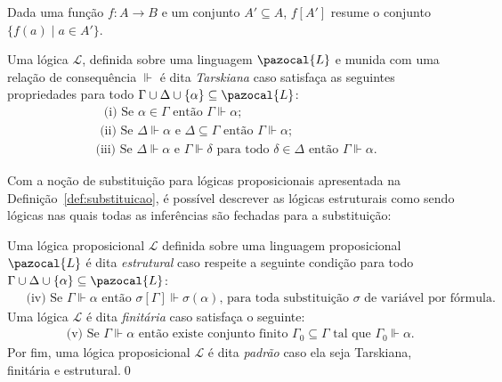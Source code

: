\begin{definicao}
    \begin{notacao}
        Dada uma função $f : A \to B$ e um conjunto $A' \subseteq A$, $f[A']$ resume o conjunto $\{f(a) \; | \; a \in A'\}$.
    \end{notacao}


    \begin{definicao}
        \label{def:tarski}
        Uma lógica $\mathcal{L}$, definida sobre uma linguagem $\pazocal{L}$ e munida com uma relação de consequência $\Vdash$ é dita \textit{Tarskiana} caso satisfaça as seguintes propriedades para todo $\Gamma \cup \Delta \cup \{\alpha\} \subseteq \pazocal{L}$:
        \begin{align}
            & \text{~~(i) Se } \alpha \in \Gamma \text{ então } \Gamma \Vdash \alpha;\tag{reflexividade}                                                                                       \\
            & \text{~(ii) Se } \Delta \Vdash \alpha \text{ e } \Delta \subseteq \Gamma \text{ então } \Gamma \Vdash \alpha;\tag{monotonicidade}                                                \\
            & \text{(iii) Se } \Delta \Vdash \alpha \text{ e } \Gamma \Vdash \delta \text{ para todo } \delta \in \Delta \text{ então } \Gamma \Vdash \alpha.\tag{corte}
        \end{align}

        Com a noção de substituição para lógicas proposicionais apresentada na Definição~\ref{def:substituicao}, é possível descrever as lógicas estruturais como sendo lógicas nas quais todas as inferências são fechadas para a substituição:

        Uma lógica proposicional $\mathcal{L}$ definida sobre uma linguagem proposicional $\pazocal{L}$ é dita \textit{estrutural} caso respeite a seguinte condição para todo $\Gamma \cup \Delta \cup \{\alpha\} \subseteq \pazocal{L}$:
        \begin{align*}
            & \text{~(iv) Se } \Gamma \Vdash \alpha \text{ então } \sigma [\Gamma] \Vdash \sigma(\alpha) \text{, para toda substituição } \sigma \text{ de variável por fórmula.}
        \end{align*}
        Uma lógica $\mathcal{L}$ é dita \textit{finitária} caso satisfaça o seguinte:
        \begin{align*}
            & \text{~~(v) Se } \Gamma \Vdash \alpha \text{ então existe conjunto finito } \Gamma_{0} \subseteq \Gamma \text{ tal que } \Gamma_{0} \Vdash \alpha.
        \end{align*}
        Por fim, uma lógica proposicional $\mathcal{L}$ é dita \textit{padrão} caso ela seja Tarskiana, finitária e estrutural.\qed{}
    \end{definicao}



\end{definicao}
